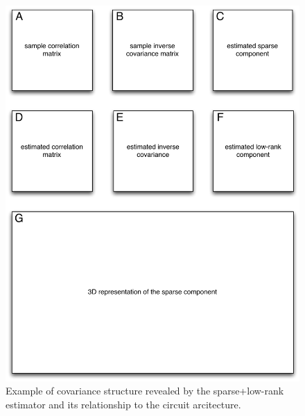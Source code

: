 \begin{figure}[htp]
\centering
\includegraphics[width=1.0\textwidth]{figures/Figure5.pdf}
\caption{
Example of covariance structure revealed by the sparse+low-rank estimator and its relationship to the circuit arcitecture.
}
\label{fig:05}
\end{figure}

